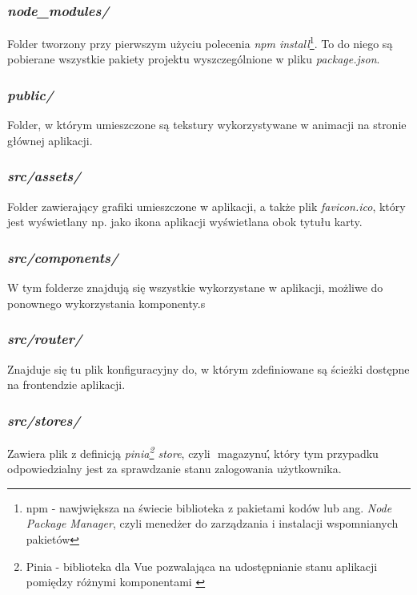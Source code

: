\documentclass[11pt,a4paper]{article}
\begin{document}

\subsubsection{\textsl{node\_modules/}}
Folder tworzony przy pierwszym użyciu polecenia \textsl{npm install}\footnote{npm - nawjwiększa na świecie biblioteka z pakietami kodów lub ang. \textsl{Node Package Manager}, czyli menedżer do zarządzania i instalacji wspomnianych pakietów}. To do niego są pobierane wszystkie pakiety projektu wyszczególnione w pliku \textsl{package.json}.

\subsubsection{\textsl{public/}}
Folder, w którym umieszczone są tekstury wykorzystywane w animacji na stronie głównej aplikacji.

\subsubsection{\textsl{src/assets/}}
Folder zawierający grafiki umieszczone w aplikacji, a także plik \textsl{favicon.ico}, który jest wyświetlany np. jako ikona aplikacji wyświetlana obok tytułu karty.

\subsubsection{\textsl{src/components/}}
W tym folderze znajdują się wszystkie wykorzystane w aplikacji, możliwe do ponownego wykorzystania komponenty.s

\subsubsection{\textsl{src/router/}}
Znajduje się tu plik konfiguracyjny do, w którym zdefiniowane są ścieżki dostępne na frontendzie aplikacji.

\subsubsection{\textsl{src/stores/}}
Zawiera plik z definicją \textsl{pinia\footnote{Pinia - biblioteka dla Vue pozwalająca na udostępnianie stanu aplikacji pomiędzy różnymi komponentami \cite{pinia}} store}, czyli \,\,magazynu\'\', który tym przypadku odpowiedzialny jest za sprawdzanie stanu zalogowania użytkownika.
\end{document}
